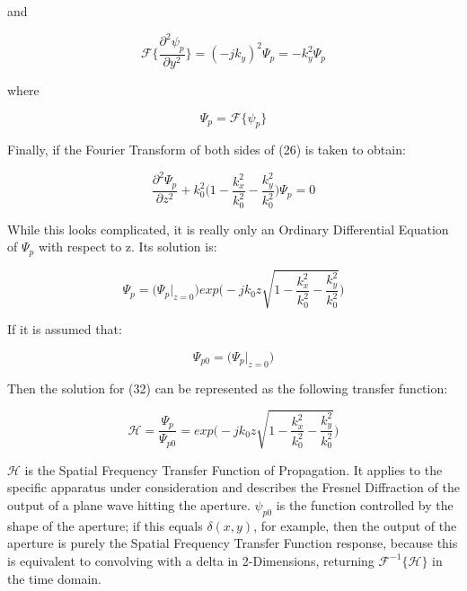 \documentclass[12pt]{article}
\begin{document}
and

\begin{equation}
	\mathscr{F} \Big\{ \frac{\partial^2 \psi_{p}}{\partial y^2} \Big\} = (-jk_{y})^2\Psi_{p} = -k_{y}^2\Psi_{p}
\end{equation}

where

\begin{equation}
	\Psi_{p} = \mathscr{F} \{\psi_{p}\}
\end{equation}

Finally, if the Fourier Transform of both sides of (26) is taken to obtain:

\begin{equation}
	\frac{\partial^2\Psi_{p}}{\partial z^2} + k_{0}^{2} \bigg ( 1 - \frac{k_{x}^2}{k_{0}^2} - \frac{k_{y}^2}{k_{0}^2} \bigg ) \Psi_{p} = 0
\end{equation}

While this looks complicated, it is really only an Ordinary Differential Equation of \(\Psi_{p}\) with respect to z. Its solution is:

\begin{equation}
	\Psi_{p} = \big(\Psi_{p}\vert_{z = 0}\big) exp\Bigg(-jk_{0}z\sqrt{1 - \frac{k_{x}^2}{k_{0}^2} - \frac{k_{y}^2}{k_{0}^2}}\Bigg)
\end{equation}

If it is assumed that:

\begin{equation}
	\Psi_{p0} = \big(\Psi_{p}\vert_{z = 0}\big)
\end{equation}

Then the solution for (32) can be represented as the following transfer function:

\begin{equation}
	\mathscr{H} = \frac{\Psi_{p}}{\Psi_{p0}} = exp\Bigg(-jk_{0}z\sqrt{1 - \frac{k_{x}^2}{k_{0}^2} - \frac{k_{y}^2}{k_{0}^2}}\Bigg)
\end{equation}

\(\mathscr{H}\) is the Spatial Frequency Transfer Function of Propagation. It applies to the specific apparatus under consideration and describes the Fresnel Diffraction of the output of a plane wave hitting the aperture. \(\psi_{p0}\) is the function controlled by the shape of the aperture; if this equals \(\delta(x,y)\), for example, then the output of the aperture is purely the Spatial Frequency Transfer Function response, because this is equivalent to convolving with a delta in 2-Dimensions, returning \(\mathscr{F}^{-1} \{\mathscr{H}\} \) in the time domain.
\end{document}
